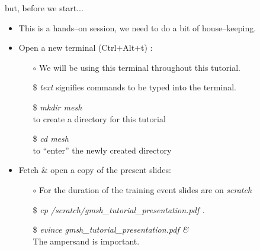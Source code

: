 \documentclass[t]{beamer}
\begin{document}
\begin{frame}{but, before we start...}
  \begin{itemize}
      \item This is a hands--on session, we need to do a bit of house--keeping.
      \vspace{10pt}
      \item Open a new terminal (Ctrl$+$Alt$+$t) :
      \begin{itemize}
         \item[$\circ$] We will be using this terminal throughout this tutorial.
         \item[\$] \emph{text} signifies commands to be typed into the terminal.
         \item[\$] \emph{mkdir mesh} \\to create a directory for this tutorial
         \item[\$] \emph{cd mesh} \\to ``enter'' the newly created directory
      \end{itemize}
      \vspace{10pt}
      \item Fetch \& open a copy of the present slides:
      \begin{itemize}
         \item[$\circ$] For the duration of the training event slides are on \emph{scratch}
         \item[\$] \emph{cp /scratch/gmsh\_tutorial\_presentation.pdf .} 
         \item[\$] \emph{evince gmsh\_tutorial\_presentation.pdf \&} \\ \hspace{10pt} The ampersand is important.
      \end{itemize}
  \end{itemize}
\end{frame}
\end{document}
